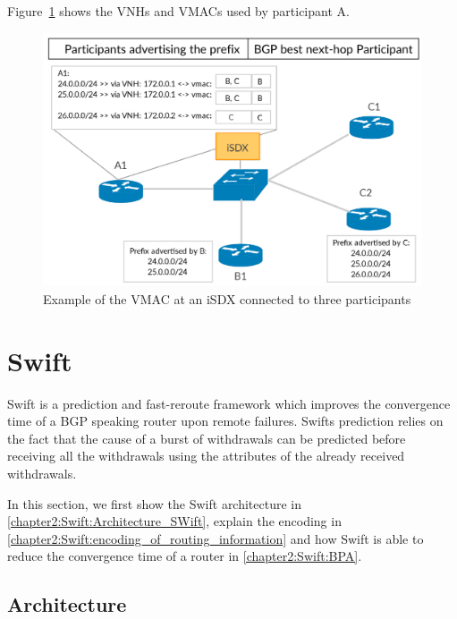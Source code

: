 Figure~\ref{fig:isdx_vmac} shows the VNHs and VMACs used by participant A.

\begin{figure}[h]
\center
\includegraphics[scale = 0.36]{Figures/bckgrnd_sdx_vmac_cropped.pdf}
\caption{Example of the VMAC at an iSDX connected to three participants}
\label{fig:isdx_vmac}
\end{figure}

\section{\label{chapter2:Swift}Swift}


Swift is a prediction and fast-reroute framework which improves the convergence time of a BGP speaking router upon remote failures. Swifts prediction relies on the fact that the cause of a burst of withdrawals can be predicted before receiving all the withdrawals using the attributes of the already received withdrawals.

In this section, we first show the Swift architecture in \ref{chapter2:Swift:Architecture_SWift}, explain the encoding in \ref{chapter2:Swift:encoding_of_routing_information} and how Swift is able to reduce the convergence time of a router in \ref{chapter2:Swift:BPA}.

\subsection{\label{chapter2:Swift:Architecture_SWift}Architecture}

